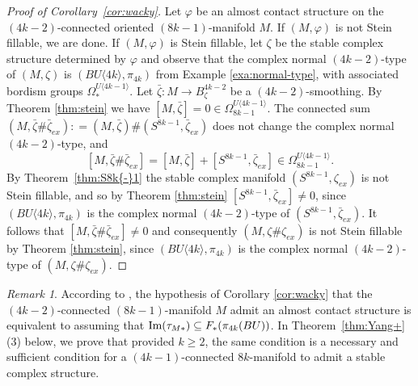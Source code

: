 \documentclass[12pt]{amsart}
\newcommand\pr{\textup{pr}}
\newcommand\acs{\varphi}  				%
\newcommand\scxs{\zeta}					%
\newcommand\bscxs{\bar \zeta}			%
\newcommand\im{\textup{Im}}
\newcommand{\an}[1]{\langle{#1}{\rangle}}
\theoremstyle{remark}
\newtheorem{Remark}[Theorem]{Remark}
\newcommand{\jbcomm}[1]{\begingroup\color{green}JB:~#1\endgroup}
\begin{document}
\begin{proof}[Proof of Corollary~\ref{cor:wacky}]
Let $\varphi$ be an almost contact structure on the 
$(4k{-}2)$-connected oriented $(8k{-}1)$-manifold $M$.
If $(M, \acs)$ is not Stein fillable, we are done.  If $(M, \acs)$ is
Stein fillable, let $\scxs$ be the stable complex structure determined by $\acs$
and observe that the complex normal $(4k{-}2)$-type of $(M, \scxs)$ is $(BU\an{4k}, \pi_{4k})$
from Example \ref{exa:normal-type}, with associated bordism groups $\Omega_*^{U\an{4k{-}1}}$.
Let $\bscxs \colon M \to B^{4k{-}2}_\scxs$ be a
$(4k{-}2)$-smoothing.  
By Theorem \ref{thm:stein} we have $[M, \bscxs]
= 0 \in \Omega_{8k{-}1}^{U\an{4k{-}1}}$.
The connected sum 
$(M, \bscxs \# \bscxs_{ex}) : = (M, \bscxs) \# (S^{8k{-}1}, \bscxs_{ex})$ 
does not change the complex
normal $(4k{-}2)$-type, and
%
\[ 
[M, \bscxs \# \bscxs_{ex}]  = [M, \bscxs] + [S^{8k{-}1}, \bscxs_{ex}] 
\in  \Omega_{8k{-}1}^{U\an{4k{-}1}}.
\]
%
By Theorem~\ref{thm:S8k{-}1} the stable complex manifold
$(S^{8k{-}1}, \zeta _{ex})$ is not
Stein fillable, and so by Theorem \ref{thm:stein} $[S^{8k{-}1}, \bscxs_{ex}] \neq 0$,
since $(BU\an{4k}, \pi_{4k})$ is the complex normal $(4k{-}2)$-type of $(S^{8k-1}, \bscxs_{ex})$.
%
It follows that $[M, \bscxs \# \bscxs_{ex}] \neq 0$ and consequently $(M, \scxs \# \scxs_{ex})$ is not Stein fillable by Theorem \ref{thm:stein}, 
since $(BU\an{4k}, \pi_{4k})$ is the complex normal $(4k{-}2)$-type of $(M, \scxs \# \scxs_{ex})$.
%
\end{proof}

\begin{Remark} \label{rem:Contact_existence}
According to \cite[Proposition 6 (vi)]{Geiges97},
the hypothesis of Corollary \ref{cor:wacky} that 
the $(4k{-}2)$-connected $(8k{-}1)$-manifold $M$ admit
an almost contact structure 
is equivalent to assuming that $\im(\tau_{M*}) \subseteq F_*(\pi_{4k}(BU))$. 
In Theorem~\ref{thm:Yang+}\,(3) below, 
we prove that provided $k\geq2$, the same condition is a necessary and sufficient condition for a $(4k{-}1)$-connected $8k$-manifold  to admit a stable complex structure.
\end{Remark}
\end{document}
